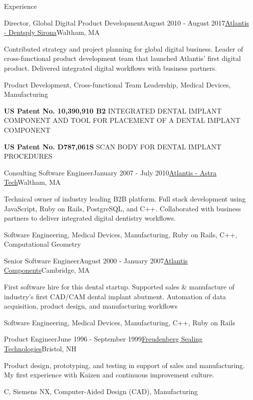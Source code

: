 \documentclass{resume}
\begin{document}
\begin{rSection}{Experience}
\begin{rSubsection}{Director, Global Digital Product Development}{August 2010 - August 2017}{\href{https://dentsplysirona.com}{Atlantis - Dentsply Sirona}}{Waltham, MA}
\item Contributed strategy and project planning for global digital business. Leader of cross-functional product development team that launched Atlantis' first digital product. Delivered integrated digital workflows with business partners.
\item Product Development, Cross-functional Team Leadership, Medical Devices, Manufacturing
\item \textbf{US Patent No. 10,390,910 B2} INTEGRATED DENTAL IMPLANT COMPONENT AND TOOL FOR PLACEMENT OF A DENTAL IMPLANT COMPONENT
\item \textbf{US Patent No. D787,061S} SCAN BODY FOR DENTAL IMPLANT PROCEDURES
\end{rSubsection}

\begin{rSubsection}{Consulting Software Engineer}{January 2007 - July 2010}{\href{https://dentsplysirona.com}{Atlantis - Astra Tech}}{Waltham, MA}
\item Technical owner of industry leading B2B platform. Full stack development using JavaScript, Ruby on Rails, PostgreSQL, and C++. Collaborated with business partners to deliver integrated digital dentistry workflows.
\item Software Engineering, Medical Devices, Manufacturing, Ruby on Rails, C++, Computational Geometry
\end{rSubsection}

\begin{rSubsection}{Senior Software Engineer}{August 2000 - January 2007}{\href{https://dentsplysirona.com}{Atlantis Components}}{Cambridge, MA}
\item First software hire for this dental startup. Supported sales \& manufacture of industry's first CAD/CAM dental implant abutment. Automation of data acquisition, product design, and manufacturing workflows
\item Software Engineering, Medical Devices, Manufacturing, C++, Ruby on Rails
\end{rSubsection}

\begin{rSubsection}{Product Engineer}{June 1996 - September 1999}{\href{https://fst.com}{Freudenberg Sealing Technologies}}{Bristol, NH}
\item Product design, prototyping, and testing in support of sales and manufacturing. My first experience with Kaizen and continuous improvement culture.
\item C, Siemens NX, Computer-Aided Design (CAD), Manufacturing
\end{rSubsection}

\end{rSection}
\end{document}
